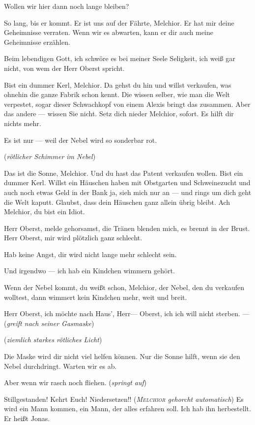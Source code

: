 \documentclass[
	final,
	a4paper,
	ngerman,
	mpinclude = true, %
	twoside = true,
	open = right,
	cleardoublepage = plain,
	DIV = 13,
	BCOR = 1cm,
	titlepage = firstiscover,
	]{scrbook}
\newcommand{\direction}[1]{(\textit{#1})}
\newcommand{\thecharacter}[1]{\textup{\textsc{#1}}\xspace}
\newcommand{\theBrix}{\thecharacter{Oberst~Brix}}
\newcommand{\theMelchior}{\thecharacter{Melchior}}
\newcommand{\character}[1]{\item[#1]}
\newcommand{\Brix}{\character{\theBrix}}
\newcommand{\Melchior}{\character{\theMelchior}}
\begin{document}
\begin{play}
\Melchior
Wollen wir hier dann noch lange bleiben?

\Brix
So lang, bis er kommt. Er ist uns auf der Fährte, Melchior. Er hat mir deine Geheimnisse verraten.
Wenn wir es abwarten, kann er dir auch meine Geheimnisse erzählen.

\Melchior
Beim lebendigen Gott, ich schwöre es bei meiner Seele Seligkeit, ich weiß gar nicht, von wem der Herr Oberst spricht.

\Brix
Bist ein dummer Kerl, Melchior. Da gehst du hin und willst verkaufen, was ohnehin die ganze Fabrik schon kennt. Die wissen selber, wie man die Welt verpestet, sogar dieser Schwachkopf von einem Alexis bringt das zusammen. Aber das andere --- wissen Sie nicht. Setz dich nieder Melchior, sofort. Es hilft dir nichts mehr.

\Melchior
Es ist nur --- weil der Nebel wird so sonderbar rot.

\direction{rötlicher Schimmer im Nebel}

\Brix
Das ist die Sonne, Melchior. Und du hast das Patent verkaufen wollen. Bist ein dummer Kerl. Willst ein Häuschen haben mit Obstgarten und Schweinezucht und auch noch etwas Geld in der Bank ja, sieh mich nur an --- und rings um dich geht die Welt kaputt. Glaubst, dass dein Häuschen ganz allein übrig bleibt. Ach Melchior, du bist ein Idiot.

\Melchior
Herr Oberst, melde gehorsamst, die Tränen blenden mich, es brennt in der Brust. Herr Oberst, mir wird plötzlich ganz schlecht.

\Brix
Hab keine Angst, dir wird nicht lange mehr schlecht sein.

\Melchior
Und irgendwo --- ich hab ein Kindchen wimmern gehört.

\Brix
Wenn der Nebel kommt, du weißt schon, Melchior, der Nebel, den du verkaufen wolltest, dann wimmert kein Kindchen mehr, weit und breit.

\Melchior
Herr Oberst, ich möchte nach Haus', Herr--- Oberst, ich ich will nicht sterben. --- \direction{greift nach seiner Gasmaske}

\direction{ziemlich starkes rötliches Licht}

\Brix
Die Maske wird dir nicht viel helfen können. Nur die Sonne hilft, wenn sie den Nebel durchdringt. Warten wir es ab.

\Melchior
Aber wenn wir rasch noch fliehen. \direction{springt auf}

\Brix
Stillgestanden! Kehrt Euch! Niedersetzen!! \direction{\theMelchior gehorcht automatisch} Es wird ein Mann kommen, ein Mann, der alles erfahren soll. Ich hab ihn herbestellt. Er heißt Jonas.


\end{play}
\end{document}
